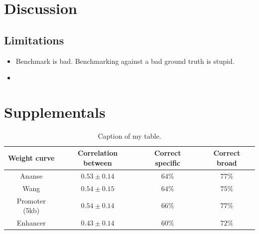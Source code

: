 \section{Discussion}

\subsection{Limitations}
\begin{itemize}
    \item Benchmark is bad. Benchmarking against a bad ground truth is stupid.
    \item 
\end{itemize}

\section{Supplementals}
\beginsupplement
\begin{table}
\begin{center}
\begin{tabular}{||c c c c||} 
\hline
Weight curve & Correlation between & Correct specific & Correct broad \\[0.5ex] 
\hline
Ananse & $0.53 \pm 0.14$ & $64\%$ & $77\%$ \\ 
\hline
Wang & $0.54 \pm 0.15 $ & $64\%$ & $75\%$ \\
\hline
Promoter (5kb) & $0.54 \pm 0.14$ & $66\%$ & $77\%$ \\
\hline
Enhancer & $0.43 \pm 0.14$ & $60\%$ & $72\%$ \\
\hline
\end{tabular}
\caption{Caption of my table.}
\label{table:1}
\end{center}
\end{table}

